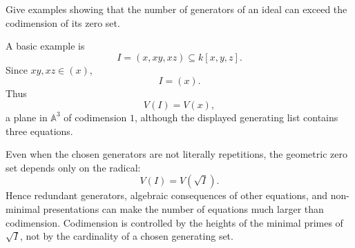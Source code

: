 \begin{problem}\label{prob:vi31-19}
Give examples showing that the number of generators of an ideal can exceed the codimension of its zero set.
\end{problem}

\ifdefined\FullProblemDossiers
\begin{solution}
A basic example is
\[
I=(x,xy,xz)\subseteq k[x,y,z].
\]
Since \(xy,xz\in(x)\),
\[
I=(x).
\]
Thus
\[
V(I)=V(x),
\]
a plane in \(\mathbb A^3\) of codimension \(1\), although the displayed generating list contains three equations.

Even when the chosen generators are not literally repetitions, the geometric zero set depends only on the
radical:
\[
V(I)=V(\sqrt I).
\]
Hence redundant generators, algebraic consequences of other equations, and non-minimal presentations can make
the number of equations much larger than codimension. Codimension is controlled by the heights of the minimal
primes of \(\sqrt I\), not by the cardinality of a chosen generating set.
\end{solution}
\fi
